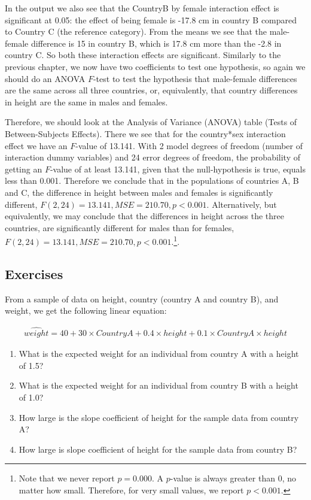 \documentclass[]{report}\usepackage[]{graphicx}\usepackage[]{color}
\begin{document}
In the output we also see that the CountryB by female interaction effect is significant at 0.05: the effect of being female is -17.8 cm in country B compared to Country C (the reference category). From the means we see that the male-female difference is 15 in country B, which is 17.8 cm more than the -2.8 in country C. So both these interaction effects are significant. Similarly to the previous chapter, we now have two coefficients to test one hypothesis, so again we should do an ANOVA $F$-test to test the hypothesis that male-female differences are the same across all three countries, or, equivalently, that country differences in height are the same in males and females.


Therefore, we should look at the Analysis of Variance (ANOVA) table (Tests of Between-Subjects Effects). There we see that for the country*sex interaction effect we have an $F$-value of 13.141. With 2 model degrees of freedom (number of interaction dummy variables) and 24 error degrees of freedom, the probability of getting an $F$-value of at least 13.141, given that the null-hypothesis is true, equals less than 0.001. Therefore we conclude that in the populations of countries A, B and C, the difference in height between males and females is significantly different, $F(2, 24)=13.141, MSE=210.70, p < 0.001$. Alternatively, but equivalently, we may conclude that the differences in height across the three countries, are significantly different for males than for females, $F(2, 24)=13.141, MSE=210.70, p < 0.001$.\footnote{Note that we never report $p=0.000$. A $p$-value is always greater than 0, no matter how small. Therefore, for very small values, we report $p < 0.001$.}. 



\subsection{Exercises}

From a sample of data on height, country (country A and country B), and weight, we get the following linear equation:


\begin{eqnarray}
\widehat{weight}= 40 + 30 \times CountryA + 0.4\times height + 0.1 \times CountryA\times height \nonumber
\end{eqnarray}

\begin{enumerate}
\item What is the expected weight for an individual from country A with a height of 1.5?\\
\item What is the expected weight for an individual from country B with a height of 1.0?\\
\item How large is the slope coefficient of height for the sample data from country A? \\
\item How large is slope coefficient of height for the sample data from country B?\\
\end{enumerate}
\end{document}
